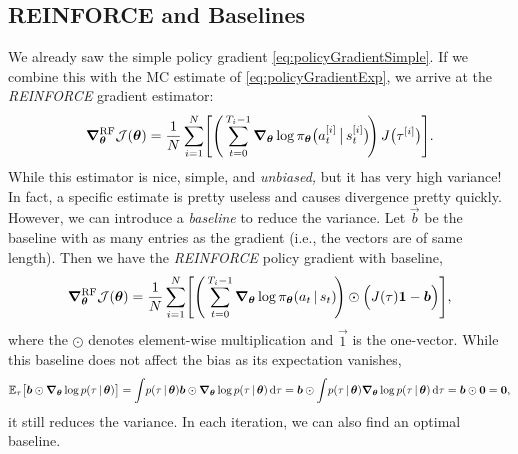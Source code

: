 		\subsection{REINFORCE and Baselines}
			We already saw the simple policy gradient \eqref{eq:policyGradientSimple}. If we combine this with the \ac{MC} estimate of \eqref{eq:policyGradientExp}, we arrive at the \emph{REINFORCE} gradient estimator:
			\begin{equation}
				\grad_{\bm{\theta}}^\mathrm{RF} \mathcal{J}(\bm{\theta})
				= \frac{1}{N} \sum_{i = 1}^{N} \Biggl[ \Biggl(\, \sum_{t = 0}^{T_i - 1} \grad_{\bm{\theta}} \log \pi_{\bm{\theta}}\bigl( a_t^{[i]} \,\big\vert\, s_t^{[i]} \bigr) \!\Biggr)\, J\bigl( \tau^{[i]} \bigr) \Biggr].
			\end{equation}
			While this estimator is nice, simple, and \emph{unbiased,} but it has very high variance! In fact, a specific estimate is pretty useless and causes divergence pretty quickly. However, we can introduce a \emph{baseline} to reduce the variance. Let \(\vec{b}\) be the baseline with as many entries as the gradient (i.e., the vectors are of same length). Then we have the \emph{REINFORCE} policy gradient with baseline,
			\begin{equation}
				\grad_{\bm{\theta}}^\mathrm{RF} \mathcal{J}(\bm{\theta})
				= \frac{1}{N} \sum_{i = 1}^{N} \Biggl[ \Biggl(\, \sum_{t = 0}^{T_i - 1} \grad_{\bm{\theta}} \log \pi_{\bm{\theta}}(a_t \,\vert\, s_t) \!\Biggr) \odot \Bigl( J(\tau) \bm{1} - \bm{b} \Bigr) \Biggr],
				\label{eq:reinforceArbitraryBaseline}
			\end{equation}
			where the \(\odot\) denotes element-wise multiplication and \(\vec{1}\) is the one-vector. While this baseline does not affect the bias as its expectation vanishes,
			\begin{equation}
				\mathbb{E}_\tau\bigl[ \bm{b} \odot \grad_{\bm{\theta}} \log p(\tau \,\vert\, \bm{\theta}) \bigr]
				= \int\! p(\tau \,\vert\, \bm{\theta}) \bm{b} \odot \grad_{\bm{\theta}} \log p(\tau \,\vert\, \bm{\theta}) \dd{\tau}
				= \bm{b} \odot \int\! p(\tau \,\vert\, \bm{\theta}) \grad_{\bm{\theta}} \log p(\tau \,\vert\, \bm{\theta}) \dd{\tau}
				= \bm{b} \odot \bm{0}
				= \bm{0},
			\end{equation}
			it still reduces the variance. In each iteration, we can also find an optimal baseline.

